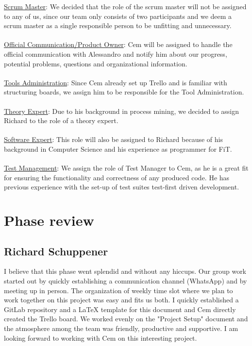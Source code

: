 \documentclass[12pt,a4paper]{article}
\begin{document}
\underline{Scrum Master}: We decided that the role of the scrum master will not be assigned to any of us, since our team only consists of two participants and we deem a scrum master as a single responsible person to be unfitting and unnecessary.
\\\\
\underline{Official Communication/Product Owner}: Cem will be assigned to handle the official communication with Alessandro and notify him about our progress, potential problems, questions and organizational information.
\\\\
\underline{Tools Administration}: Since Cem already set up Trello and is familiar with structuring boards, we assign him to be responsible for the Tool Administration.
\\\\
\underline{Theory Expert}: Due to his background in process mining, we decided to assign Richard to the role of a theory expert. 
\\\\
\underline{Software Expert}: This role will also be assigned to Richard because of his background in Computer Science and his experience as programmer for FiT.
\\\\
\underline{Test Management}: We assign the role of Test Manager to Cem, as he is a great fit for ensuring the functionality and correctness of any produced code. He has previous experience with the set-up of test suites test-first driven development.


\section{Phase review}
\subsection{Richard Schuppener}
I believe that this phase went splendid and without any hiccups. Our group work started out by quickly establishing a communication channel (WhatsApp) and by meeting up in person. The organization of weekly time slot where we plan to work together on this project was easy and fits us both. I quickly established a GitLab repository and a LaTeX template for this document and Cem directly created the Trello board.
We worked evenly on the "Project Setup" document and the atmosphere among the team was friendly, productive and supportive. I am looking forward to working with Cem on this interesting project.
\end{document}
